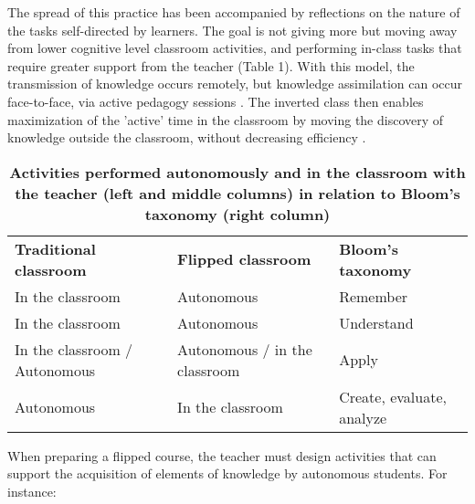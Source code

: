 \documentclass[10pt,letterpaper]{article}
\newlength\savedwidth
\newcommand\thickhline{\noalign{\global\savedwidth\arrayrulewidth\global\arrayrulewidth 2pt}%
\hline
\noalign{\global\arrayrulewidth\savedwidth}}
\begin{document}
The spread of this practice has been accompanied by reflections on the nature of the tasks self-directed by learners. 
The goal is not giving more \cite{lo_critical_2017} but moving away from lower cognitive level classroom activities, 
and performing in-class tasks that require greater support from the teacher \cite{lebrun_vers_2016,anderson_taxonomy_2001,bloom_taxonomy_1956,sarawagi_flipped_2014} (Table 1). 
With this model, the transmission of knowledge occurs remotely, but knowledge assimilation can occur face-to-face, 
via active pedagogy sessions \cite{freeman_reply_2014}. 
The inverted class then enables maximization of the 'active' time in the classroom 
by moving the discovery of knowledge outside the classroom, without decreasing efficiency \cite{delozier_flipped_2017}.


\begin{table}[!ht]
\begin{adjustwidth}{-2.25in}{0in} %
\centering
\caption{{\bf Activities performed autonomously and in the classroom with the teacher (left and middle columns) in relation to Bloom's taxonomy (right column)}}
\begin{tabular}{|l|l|l|}
\hline
{\bf Traditional classroom} & {\bf Flipped classroom} & {\bf Bloom's taxonomy} \\ \thickhline
In the classroom & Autonomous & Remember \\ \hline
In the classroom & Autonomous & Understand \\ \hline
In the classroom / Autonomous & Autonomous / in the classroom & Apply \\ \hline
Autonomous & In the classroom & Create, evaluate, analyze \\ \hline



\end{tabular}
\label{table1}
\end{adjustwidth}
\end{table}


When preparing a flipped course, the teacher must design activities that can support 
the acquisition of elements of knowledge by autonomous students. For instance:
\end{document}
